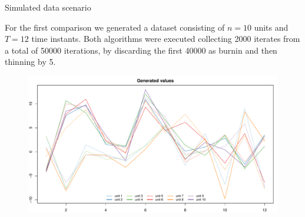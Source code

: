 \documentclass[
	11pt, %
 xcolor={dvipsnames,svgnames}
]{beamer}
\let\cite\citep
\begin{document}
\begin{frame}{Simulated data scenario}

For the first comparison we generated a dataset consisting of $n=10$ units and $T=12$ time instants. 
Both algorithms were executed collecting 2000 iterates from a total of 50000 iterations, by discarding the first 40000 as burnin and then thinning by 5.
\begin{figure}[!p]
    \centering
    \includegraphics[width=0.8\linewidth]{Testing//Assessing correctness//no space/test_1_generated_data.pdf}
    \label{fig: fitted and target values no space}
\end{figure}
\end{frame}
\end{document}
